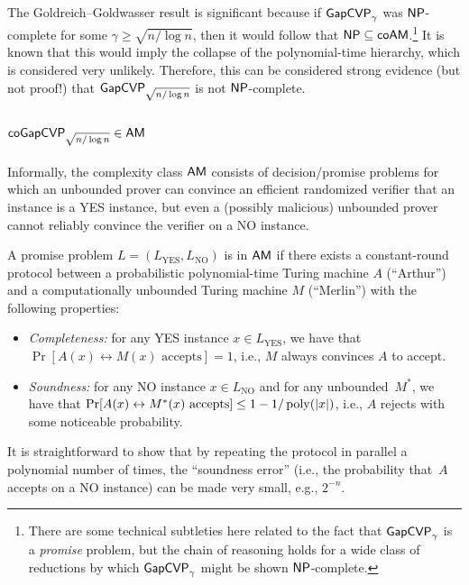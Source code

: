 \documentclass[11pt]{article}
\begin{document}
The Goldreich--Goldwasser result is significant because if
$\mathsf{GapCVP}_{\gamma}$ was $\mathsf{NP}$-complete for some
$\gamma \geq \sqrt{n/\log n}$, then it would follow that
$\mathsf{NP} \subseteq \mathsf{coAM}$.\footnote{There are some technical subtleties
  here related to the fact that $\mathsf{GapCVP}_{\gamma}$ is a \emph{promise}
  problem, but the chain of reasoning holds for a wide class of
  reductions by which $\mathsf{GapCVP}_{\gamma}$ might be shown
  $\mathsf{NP}$-complete.} It is known that this would imply the collapse of
the polynomial-time hierarchy, which is considered very unlikely.
Therefore, this can be considered strong evidence (but not proof!)
that $\mathsf{GapCVP}_{\sqrt{n/\log n}}$ is not $\mathsf{NP}$-complete.

\subsection{$\mathsf{coGapCVP}_{\sqrt{n/\log n}} \in \mathsf{AM}$}
\label{sec:cogapcvp-in-am}

Informally, the complexity class $\AM$ consists of decision/promise
problems for which an unbounded prover can convince an efficient
randomized verifier that an instance is a YES instance, but even a
(possibly malicious) unbounded prover cannot reliably convince the
verifier on a NO instance.

\begin{definition}[$\AM$]
  \label{def:AM}
  A promise problem $L = (L_{\text{YES}}, L_{\text{NO}})$ is in $\AM$
  if there exists a constant-round protocol between a probabilistic
  polynomial-time Turing machine $A$ (``Arthur'') and a
  computationally unbounded Turing machine $M$ (``Merlin'') with the
  following properties:
  \begin{itemize}
  \item \emph{Completeness:} for any YES instance
    $x \in L_{\text{YES}}$, we have that
    $\Pr[A(x) \leftrightarrow M(x) \text{ accepts}] = 1$, i.e., $M$
    always convinces $A$ to accept.

  \item \emph{Soundness:} for any NO instance $x \in L_{\text{NO}}$
    and for any unbounded~$M^*$, we have that
    $\Pr[A(x) \leftrightarrow M^*(x) \text{ accepts}] \leq 1-
    1/\operatorname{poly}(\lvert x\rvert)$, i.e., $A$ rejects with some noticeable
    probability.
  \end{itemize}
\end{definition}
It is straightforward to show that by repeating the protocol in
parallel a polynomial number of times, the ``soundness error'' (i.e.,
the probability that~$A$ accepts on a NO instance) can be made very
small, e.g., $2^{-n}$.
\end{document}
